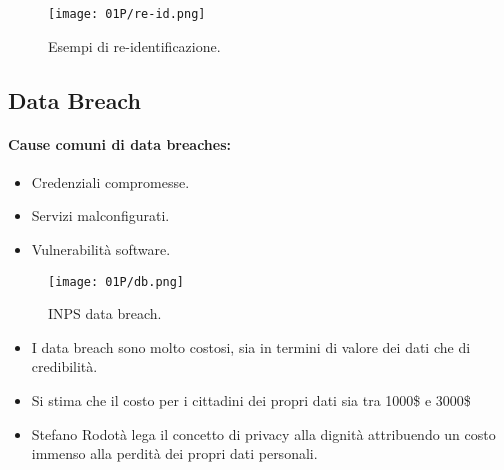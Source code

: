 \begin{figure}[h]
    \centering
    \texttt{[image: 01P/re-id.png]}
    \caption{Esempi di re-identificazione.}
    \label{fig:ae}

  \end{figure}

\subsection{Data Breach}

\paragraph{Cause comuni di data breaches:}

\begin{itemize}
  \item Credenziali compromesse. 
  \item Servizi malconfigurati. 
  \item Vulnerabilità software.
\end{itemize}


\begin{figure}[h]
    \centering
    \texttt{[image: 01P/db.png]}
    \caption{INPS data breach.}
    \label{fig:db}

  \end{figure}

\begin{itemize}
  \item I data breach sono molto costosi, sia in termini di valore dei dati che di credibilità. 
  \item Si stima che il costo per i cittadini dei propri dati sia tra 1000\$ e 3000\$
  \item Stefano Rodotà lega il concetto di privacy alla dignità attribuendo un costo immenso alla perdità dei propri dati personali.
\end{itemize}











